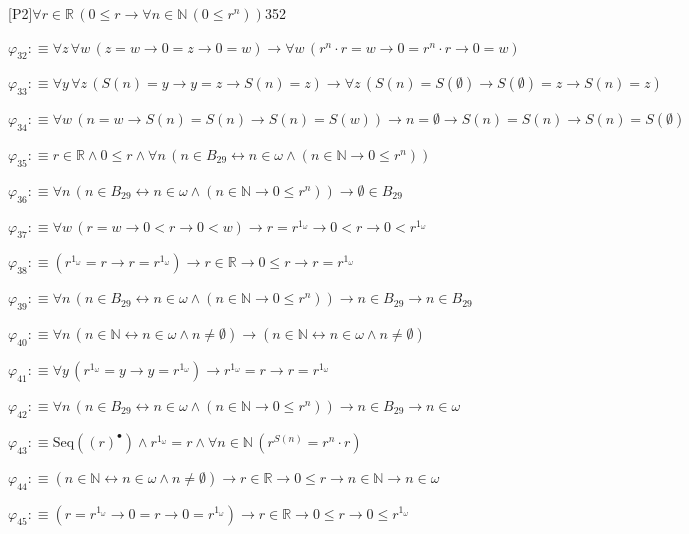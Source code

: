 \begin{fullproof}{[P2]}{$\forall r \in \mathbb{R}\,(0 \leq r \to \forall n \in \mathbb{N}\,(0 \leq {{r}^{n}}))$}{352}
\begin{abbrevlist}
\item $\varphi_{32} :\equiv \forall z\,\forall w\,(z = w \to 0 = z \to 0 = w) \to \forall w\,({{r}^{n}} \cdot r = w \to 0 = {{r}^{n}} \cdot r \to 0 = w)$
\item $\varphi_{33} :\equiv \forall y\,\forall z\,(S(n) = y \to y = z \to S(n) = z) \to \forall z\,(S(n) = S(\emptyset) \to S(\emptyset) = z \to S(n) = z)$
\item $\varphi_{34} :\equiv \forall w\,(n = w \to S(n) = S(n) \to S(n) = S(w)) \to n = \emptyset \to S(n) = S(n) \to S(n) = S(\emptyset)$
\item $\varphi_{35} :\equiv r \in \mathbb{R} \land 0 \leq r \land \forall n\,(n \in B_{29} \leftrightarrow n \in \omega \land (n \in \mathbb{N} \to 0 \leq {{r}^{n}}))$
\item $\varphi_{36} :\equiv \forall n\,(n \in B_{29} \leftrightarrow n \in \omega \land (n \in \mathbb{N} \to 0 \leq {{r}^{n}})) \to \emptyset \in B_{29}$
\item $\varphi_{37} :\equiv \forall w\,(r = w \to 0 < r \to 0 < w) \to r = {{r}^{1_{\omega}}} \to 0 < r \to 0 < {{r}^{1_{\omega}}}$
\item $\varphi_{38} :\equiv ({{r}^{1_{\omega}}} = r \to r = {{r}^{1_{\omega}}}) \to r \in \mathbb{R} \to 0 \leq r \to r = {{r}^{1_{\omega}}}$
\item $\varphi_{39} :\equiv \forall n\,(n \in B_{29} \leftrightarrow n \in \omega \land (n \in \mathbb{N} \to 0 \leq {{r}^{n}})) \to n \in B_{29} \to n \in B_{29}$
\item $\varphi_{40} :\equiv \forall n\,(n \in \mathbb{N} \leftrightarrow n \in \omega \land n \neq \emptyset) \to (n \in \mathbb{N} \leftrightarrow n \in \omega \land n \neq \emptyset)$
\item $\varphi_{41} :\equiv \forall y\,({{r}^{1_{\omega}}} = y \to y = {{r}^{1_{\omega}}}) \to {{r}^{1_{\omega}}} = r \to r = {{r}^{1_{\omega}}}$
\item $\varphi_{42} :\equiv \forall n\,(n \in B_{29} \leftrightarrow n \in \omega \land (n \in \mathbb{N} \to 0 \leq {{r}^{n}})) \to n \in B_{29} \to n \in \omega$
\item $\varphi_{43} :\equiv \mathrm{Seq}({(r)^{\bullet}}) \land {{r}^{1_{\omega}}} = r \land \forall n \in \mathbb{N}\,({{r}^{S(n)}} = {{r}^{n}} \cdot r)$
\item $\varphi_{44} :\equiv (n \in \mathbb{N} \leftrightarrow n \in \omega \land n \neq \emptyset) \to r \in \mathbb{R} \to 0 \leq r \to n \in \mathbb{N} \to n \in \omega$
\item $\varphi_{45} :\equiv (r = {{r}^{1_{\omega}}} \to 0 = r \to 0 = {{r}^{1_{\omega}}}) \to r \in \mathbb{R} \to 0 \leq r \to 0 \leq {{r}^{1_{\omega}}}$

\end{abbrevlist}
\end{fullproof}
